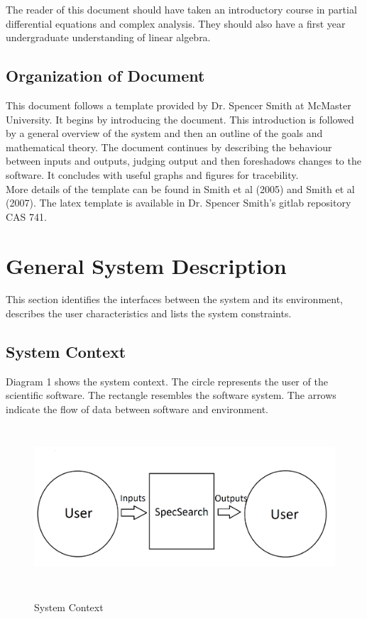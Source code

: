 \documentclass[12pt]{article}
\begin{document}
The reader of this document should have taken an introductory course 
in partial differential equations and complex analysis. They should also have a 
first year undergraduate understanding of linear algebra.

\subsection{Organization of Document}

This document follows a template provided by Dr. Spencer Smith at McMaster 
University. It begins by introducing the document. This introduction is 
followed by a general overview of the system and then an outline of the goals 
and mathematical theory. The document continues by describing the behaviour 
between inputs 
and outputs, judging output and then foreshadows changes to the software. It 
concludes with useful graphs and figures for tracebility. \\ 

More details of the template can be found in Smith et al (2005)  and Smith et al 
(2007). The latex template is available in Dr. Spencer Smith's gitlab 
repository CAS 741. 

\section{General System Description}

This section identifies the interfaces between the system and its environment,
describes the user characteristics and lists the system constraints.

\subsection{System Context} 
Diagram 1 shows the system context. The circle represents the user of the 
scientific software. The rectangle resembles the software system. The arrows 
indicate the flow of data between software and environment. 
 \begin{figure}[h!]
	\begin{center}
		{
			\includegraphics[width=15cm,height=6cm]{SystemContext.png}
		} 
	\caption{System Context}
	\end{center}
 \end{figure}
\end{document}
